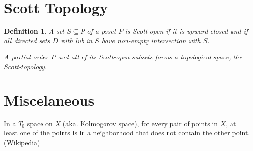 \documentclass{article}
\newtheorem{definition}{Definition}%
\begin{document}
\section{Scott Topology}

\begin{definition}
A set $S \subseteq P$ of a poset $P$ is Scott-open if it is upward
closed and if all directed sets $D$ with lub in $S$ have non-empty
intersection with $S$.

A partial order $P$ and all of its Scott-open subsets forms a
topological space, the Scott-topology.
\end{definition}

\section{Miscelaneous}

In a $T_0$ space on $X$ (aka. Kolmogorov space), for every pair of
points in $X$, at least one of the points is in a neighborhood that
does not contain the other point. (Wikipedia)
\end{document}

